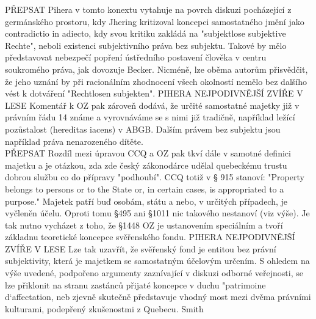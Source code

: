 \documentclass{article}
\begin{document}


PŘEPSAT
Pihera v tomto konextu vytahuje na povrch diskuzi pocházející z germánského prostoru, kdy Jhering kritizoval koncepci samostatného jmění jako contradictio in adiecto, kdy svou kritiku zakládá na "subjektlose subjektive Rechte", neboli existenci subjektivního práva bez subjektu. Takové by mělo představovat nebezpečí popření ústředního postavení člověka v centru soukromého práva, jak dovozuje Becker. Nicméně, lze oběma autorům přisvědčit, že jeho uznání by při racionálním zhodnocení všech okolností nemělo bez dalšího vést k dotváření "Rechtlosen subjekten". PIHERA NEJPODIVNĚJŠÍ ZVÍŘE V LESE Komentář k OZ pak zároveň dodává, že určité samostatné majetky již v právním řádu 14 známe a vyrovnáváme se s nimi již tradičně, například ležící pozůstalost (hereditas iacens) v ABGB. Dalším právem bez subjektu jsou například práva nenarozeného dítěte.\\

PŘEPSAT
Rozdíl mezi úpravou CCQ a OZ pak tkví dále v samotné definici majetku a je otázkou, zda zde český zákonodárce udělal quebeckému trustu dobrou službu co do přípravy "podhoubí". CCQ totiž v § 915 stanoví: "Property belongs to persons or to the State or, in certain cases, is appropriated to a purpose." Majetek patří buď osobám, státu a nebo, v určitých případech, je vyčleněn účelu. Oproti tomu §495 ani §1011 nic takového nestanoví (viz výše). Je tak nutno vycházet z toho, že §1448 OZ je ustanovením speciálním a tvoří základnu teoretické koncepce svěřenského fondu. PIHERA NEJPODIVNĚJŠÍ ZVÍŘE V LESE Lze tak uzavřít, že svěřenský fond je entitou bez právní subjektivity, která je majetkem se samostatným účelovým určením. S ohledem na výše uvedené, podpořeno argumenty zaznívající v diskuzi odborné veřejnosti, se lze přiklonit na stranu zastánců přijaté koncepce v duchu "patrimoine d`affectation, neb zjevně skutečně představuje vhodný most mezi dvěma právními kulturami, podepřený zkušenostmi z Quebecu. Smith\\
\end{document}
